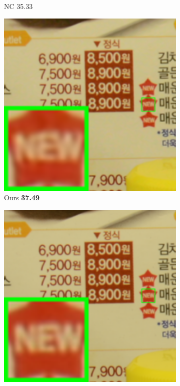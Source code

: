 \begin{figure}
\begin{subfigure}[t]{0.19\textwidth}
		\caption{NC 35.33}
    \end{subfigure}
    \hfill
    \begin{subfigure}[t]{0.19\textwidth}
        \centering
        \includegraphics[width=1\textwidth]{images/guided/resize_br_Guided_CC_Noisy_Nikon_D800_ISO_3200_A3_66.png}
		\caption{Ours \textbf{37.49}}
    \end{subfigure}
    \hfill
    \begin{subfigure}[t]{0.19\textwidth}
        \centering
        \includegraphics[width=1\textwidth]{images/guided/resize_br_Mean_CC_Noisy_Nikon_D800_ISO_3200_A3_66.png}

\end{subfigure}
\end{figure}
